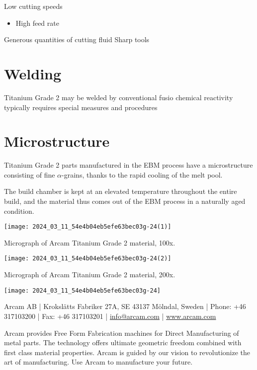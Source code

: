 \documentclass[10pt]{article}
\begin{document}
Low cutting speeds

\begin{itemize}
  \item High feed rate
\end{itemize}

Generous quantities of cutting fluid Sharp tools

\section*{Welding}
Titanium Grade 2 may be welded by conventional fusio chemical reactivity typically requires special measures and procedures

\section*{Microstructure}
Titanium Grade 2 parts manufactured in the EBM process have a microstructure consisting of fine $\alpha$-grains, thanks to the rapid cooling of the melt pool.

The build chamber is kept at an elevated temperature throughout the entire build, and the material thus comes out of the EBM process in a naturally aged condition.

\begin{center}
\texttt{[image: 2024\_03\_11\_54e4b04eb5efe63bec03g-24(1)]}
\end{center}

Micrograph of Arcam Titanium Grade 2 material, 100x.

\begin{center}
\texttt{[image: 2024\_03\_11\_54e4b04eb5efe63bec03g-24(2)]}
\end{center}

Micrograph of Arcam Titanium Grade 2 material, 200x.

\begin{center}
\texttt{[image: 2024\_03\_11\_54e4b04eb5efe63bec03g-24]}
\end{center}

Arcam AB | Krokslätts Fabriker 27A, SE 43137 Mölndal, Sweden | Phone: +46 317103200 | Fax: +46 317103201 | \href{mailto:info@arcam.com}{info@arcam.com} | \href{http://www.arcam.com}{www.arcam.com}

Arcam provides Free Form Fabrication machines for Direct Manufacturing of metal parts. The technology offers ultimate geometric freedom combined with first class material properties. Arcam is guided by our vision to revolutionize the art of manufacturing. Use Arcam to manufacture your future.
\end{document}
